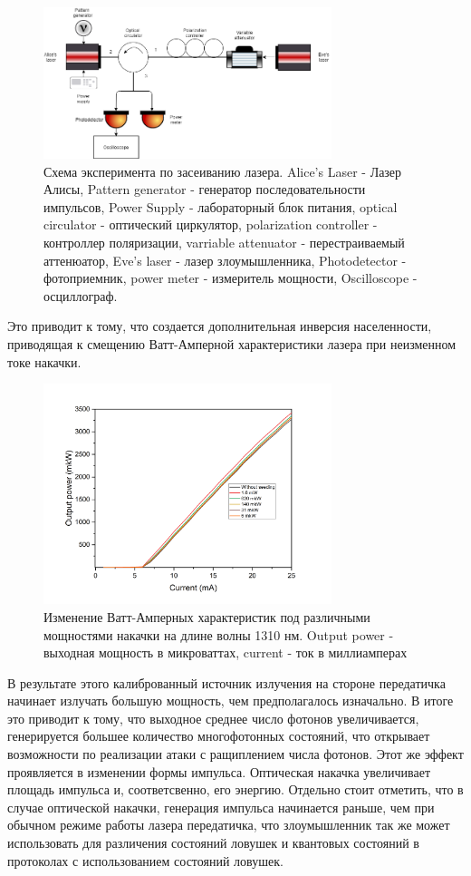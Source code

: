 \begin{figure}
    \centering
    \includegraphics[width=0.75\textwidth]{images/1310 experiment.png}
    \caption{Схема эксперимента по засеиванию лазера. Alice's Laser -  Лазер Алисы, Pattern generator - генератор последовательности импульсов, Power Supply - лабораторный блок питания, optical circulator - оптический циркулятор, polarization controller - контроллер поляризации, varriable attenuator - перестраиваемый аттенюатор, Eve's laser - лазер злоумышленника, Photodetector - фотоприемник, power meter - измеритель мощности, Oscilloscope - осциллограф.}
    \label{fig:exper 1310 ref}
\end{figure}
Это приводит к тому, что создается дополнительная инверсия населенности, приводящая к смещению Ватт-Амперной характеристики лазера при неизменном токе накачки.
\begin{figure}
    \centering
    \includegraphics[width=0.75\textwidth]{images/ватт ампер для диссера.png}
    \caption{Изменение Ватт-Амперных характеристик под различными мощностями накачки на длине волны 1310 нм. Output power - выходная мощность в микроваттах, current - ток в миллиамперах}
    \label{fig:watt-amp ref}
\end{figure}
В результате этого калиброванный источник излучения на стороне передатичка начинает излучать большую мощность, чем предполагалось изначально. В итоге это приводит к тому, что выходное среднее число фотонов увеличивается, генерируется большее количество многофотонных состояний, что открывает возможности по реализации атаки с ращиплением числа фотонов. Этот же эффект проявляется в изменении формы импульса. Оптическая накачка увеличивает площадь импульса и, соответсвенно, его энергию. Отдельно стоит отметить, что в случае оптической накачки, генерация импульса начинается раньше, чем при обычном режиме работы лазера передатичка, что злоумышленник так же может использовать для различения состояний ловушек и квантовых состояний в протоколах с использованием состояний ловушек. 
